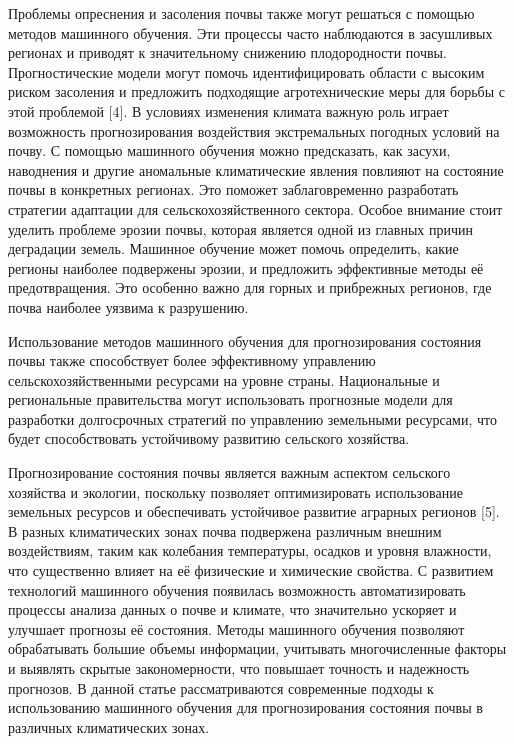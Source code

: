 \begin{multicols}{2}
Проблемы опреснения и засоления почвы также могут решаться с помощью
методов машинного обучения. Эти процессы часто наблюдаются в засушливых
регионах и приводят к значительному снижению плодородности почвы.
Прогностические модели могут помочь идентифицировать области с высоким
риском засоления и предложить подходящие агротехнические меры для борьбы
с этой проблемой {[}4{]}. В условиях изменения климата важную роль
играет возможность прогнозирования воздействия экстремальных погодных
условий на почву. С помощью машинного обучения можно предсказать, как
засухи, наводнения и другие аномальные климатические явления повлияют на
состояние почвы в конкретных регионах. Это поможет заблаговременно
разработать стратегии адаптации для сельскохозяйственного сектора.
Особое внимание стоит уделить проблеме эрозии почвы, которая является
одной из главных причин деградации земель. Машинное обучение может
помочь определить, какие регионы наиболее подвержены эрозии, и
предложить эффективные методы её предотвращения. Это особенно важно для
горных и прибрежных регионов, где почва наиболее уязвима к разрушению.

Использование методов машинного обучения для прогнозирования состояния
почвы также способствует более эффективному управлению
сельскохозяйственными ресурсами на уровне страны. Национальные и
региональные правительства могут использовать прогнозные модели для
разработки долгосрочных стратегий по управлению земельными ресурсами,
что будет способствовать устойчивому развитию сельского хозяйства.

Прогнозирование состояния почвы является важным аспектом сельского
хозяйства и экологии, поскольку позволяет оптимизировать использование
земельных ресурсов и обеспечивать устойчивое развитие аграрных регионов
{[}5{]}. В разных климатических зонах почва подвержена различным внешним
воздействиям, таким как колебания температуры, осадков и уровня
влажности, что существенно влияет на её физические и химические
свойства. С развитием технологий машинного обучения появилась
возможность автоматизировать процессы анализа данных о почве и климате,
что значительно ускоряет и улучшает прогнозы её состояния. Методы
машинного обучения позволяют обрабатывать большие объемы информации,
учитывать многочисленные факторы и выявлять скрытые закономерности, что
повышает точность и надежность прогнозов. В данной статье
рассматриваются современные подходы к использованию машинного обучения
для прогнозирования состояния почвы в различных климатических зонах.


\end{multicols}
